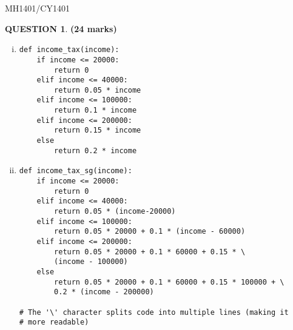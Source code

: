 \documentclass[a4paper,12pt]{article}
\theoremstyle{definition}
\newtheorem{ques}[dummy]{QUESTION}
\theoremstyle{plain}
\newcommand{\py}{python}
\begin{document}
\newpage
\hfill MH1401/CY1401\vspace*{0.5em}
\begin{ques}\hfill \textbf{(24 marks)}\\
	\begin{enumerate}[(i)]
		\item 
		\begin{verbatim}
def income_tax(income):
    if income <= 20000:
        return 0
    elif income <= 40000:
        return 0.05 * income
    elif income <= 100000:
        return 0.1 * income
    elif income <= 200000:
        return 0.15 * income
    else
        return 0.2 * income
		\end{verbatim}
		
		
		\item 
		\begin{verbatim}
def income_tax_sg(income):
    if income <= 20000:
        return 0
    elif income <= 40000:
        return 0.05 * (income-20000)
    elif income <= 100000:
        return 0.05 * 20000 + 0.1 * (income - 60000)
    elif income <= 200000:
        return 0.05 * 20000 + 0.1 * 60000 + 0.15 * \
        (income - 100000)
    else
        return 0.05 * 20000 + 0.1 * 60000 + 0.15 * 100000 + \ 
        0.2 * (income - 200000)

# The '\' character splits code into multiple lines (making it 
# more readable)
		\end{verbatim}
	\end{enumerate}
\end{ques}
\end{document}
